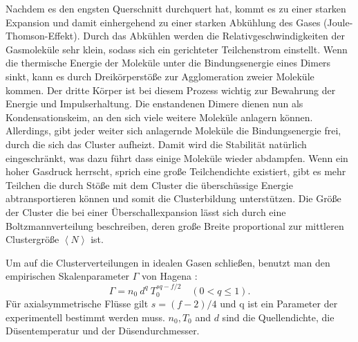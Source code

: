 Nachdem es den engsten Querschnitt durchquert hat, kommt es zu einer starken Expansion und damit einhergehend zu einer starken Abkühlung des Gases (Joule-Thomson-Effekt). Durch das Abkühlen werden die Relativgeschwindigkeiten der Gasmoleküle sehr klein, sodass sich ein gerichteter Teilchenstrom einstellt. Wenn die thermische Energie der Moleküle unter die Bindungsenergie eines Dimers sinkt, kann es durch Dreikörperstöße zur Agglomeration zweier Moleküle kommen. Der dritte Körper ist bei diesem Prozess wichtig zur Bewahrung der Energie und Impulserhaltung. Die enstandenen Dimere dienen nun als Kondensationskeim, an den sich viele weitere Moleküle anlagern können. Allerdings, gibt jeder weiter sich anlagernde Moleküle die Bindungsenergie frei, durch die sich das Cluster aufheizt. Damit wird die Stabilität natürlich eingeschränkt, was dazu führt dass einige Moleküle wieder abdampfen. Wenn ein hoher Gasdruck herrscht, sprich eine große Teilchendichte existiert, gibt es mehr Teilchen die durch Stöße mit dem Cluster die überschüssige Energie abtransportieren können und somit die Clusterbildung unterstützen.
Die Größe der Cluster die bei einer Überschallexpansion lässt sich durch eine Boltzmannverteilung beschreiben, deren große Breite proportional zur mittleren Clustergröße $\left\langle N \right\rangle$ ist. 

Um auf die Clusterverteilungen in idealen Gasen schließen, benutzt man den empirischen Skalenparameter $\Gamma$ von Hagena \cite{hagena1987}:
%
\begin{equation} \label{eq:Skalenparameter}
\Gamma = n_0\ d^q\ T_0^{sq - f/2} \quad (0 < q \leq 1).
\end{equation}
%
Für axialsymmetrische Flüsse gilt $s = (f-2)/4$ und q ist ein Parameter der experimentell bestimmt werden muss. $n_0, T_0$ and $d$ sind die Quellendichte, die Düsentemperatur und der Düsendurchmesser.

